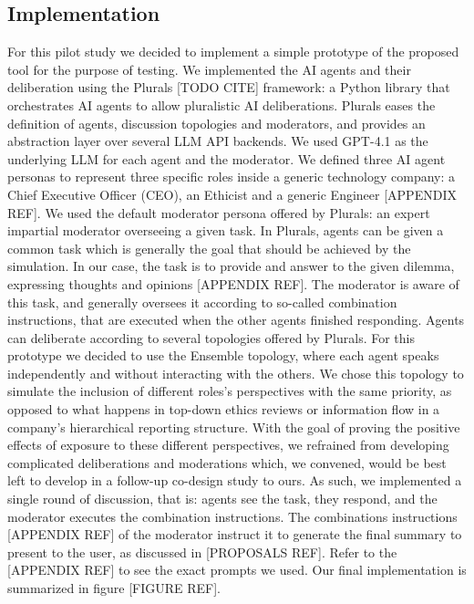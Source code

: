 \documentclass[sigconf, authorversion, nonacm, screen]{acmart}
\begin{document}
\subsection{Implementation}

For this pilot study we decided to implement a simple prototype of the proposed tool for the purpose of testing.
We implemented the AI agents and their deliberation using the Plurals [TODO CITE] framework: a Python library that orchestrates AI agents to allow pluralistic AI deliberations.
Plurals eases the definition of agents, discussion topologies and moderators, and provides an abstraction layer over several LLM API backends.
We used GPT-4.1 as the underlying LLM for each agent and the moderator.
We defined three AI agent personas to represent three specific roles inside a generic technology company: a Chief Executive Officer (CEO), an Ethicist and a generic Engineer [APPENDIX REF].
We used the default moderator persona offered by Plurals: an expert impartial moderator overseeing a given task.
In Plurals, agents can be given a common task which is generally the goal that should be achieved by the simulation.
In our case, the task is to provide and answer to the given dilemma, expressing thoughts and opinions [APPENDIX REF].
The moderator is aware of this task, and generally oversees it according to so-called combination instructions, that are executed when the other agents finished responding.
Agents can deliberate according to several topologies offered by Plurals.
For this prototype we decided to use the Ensemble topology, where each agent speaks independently and without interacting with the others.
We chose this topology to simulate the inclusion of different roles's perspectives with the same priority, as opposed to what happens in top-down ethics reviews or information flow in a company's hierarchical reporting structure.
With the goal of proving the positive effects of exposure to these different perspectives, we refrained from developing complicated deliberations and moderations which, we convened, would be best left to develop in a follow-up co-design study to ours.
As such, we implemented a single round of discussion, that is: agents see the task, they respond, and the moderator executes the combination instructions.
The combinations instructions [APPENDIX REF] of the moderator instruct it to generate the final summary to present to the user, as discussed in [PROPOSALS REF].
Refer to the [APPENDIX REF] to see the exact prompts we used.
Our final implementation is summarized in figure [FIGURE REF].
\end{document}
